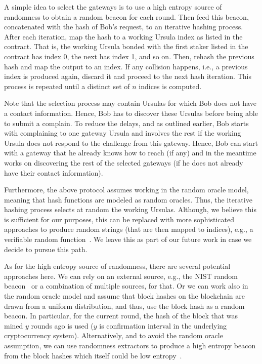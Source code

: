 A simple idea to select the gateways is to use a high entropy source of randomness to obtain a random beacon for each round. Then feed this beacon, concatenated with the hash of Bob's request, to an iterative hashing process. After each iteration, map the hash to a working Ursula index as listed in the \stakeescrow contract. That is, the working Ursula bonded with the first staker listed in the contract has index 0, the next has index 1, and so on. Then, rehash the previous hash and map the output to an index. If any collision happens, i.e., a previous index is produced again, discard it and proceed to the next hash iteration. This process is repeated until a distinct set of $n$ indices is computed. 


Note that the selection process may contain Ursulas for which Bob does not have a contact information. Hence, Bob has to discover these Ursulas before being able to submit a complain. To reduce the delays, and as outlined earlier, Bob starts with complaining to one gateway Ursula and involves the rest if the working Ursula does not respond to the challenge from this gateway. Hence, Bob can start with a gateway that he already knows how to reach (if any) and in the meantime works on discovering the rest of the selected gateways (if he does not already have their contact information).


Furthermore, the above protocol assumes working in the random oracle model, meaning that hash functions are modeled as random oracles. Thus, the iterative hashing process selects at random the working Ursulas. Although, we believe this is sufficient for our purposes, this can be replaced with more sophisticated approaches to produce random strings (that are then mapped to indices), e.g., a verifiable random function~\cite{micali1999verifiable}. We leave this as part of our future work in case we decide to pursue this path. 


As for the high entropy source of randomness, there are several potential approaches here. We can rely on an external source, e.g., the NIST random beacon~\cite{nist-beacon} or a combination of multiple sources, for that. Or we can work also in the random oracle model and assume that block hashes on the blockchain are drawn from a uniform distribution, and thus, use the block hash as a random beacon. In particular, for the current round, the hash of the block that was mined $y$ rounds ago is used ($y$ is confirmation interval in the underlying cryptocurrency system). Alternatively, and to avoid the random oracle assumption, we can use randomness extractors to produce a high entropy beacon from the block hashes which itself could be low entropy~\cite{bonneau2015bitcoin}.


